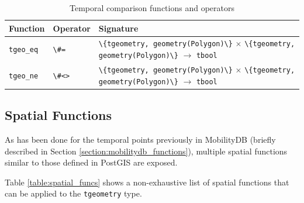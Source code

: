 \begin{table}[h!]
    \centering
    \begin{tabularx}{\textwidth}{|l|l|X|}
    \hline
    \textbf{Function}   & \textbf{Operator} & \textbf{Signature} \\
    \hline
    \lstinline+tgeo_eq+    & \lstinline+\#=+   & \lstinline+\{tgeometry, geometry(Polygon)\}+ $\times$ \lstinline+\{tgeometry, geometry(Polygon)\}+ $\rightarrow$ \lstinline+tbool+ \\
    \hline
    \lstinline+tgeo_ne+    & \lstinline+\#<>+  & \lstinline+\{tgeometry, geometry(Polygon)\}+ $\times$ \lstinline+\{tgeometry, geometry(Polygon)\}+ $\rightarrow$ \lstinline+tbool+ \\
    \hline
    \end{tabularx}
    \caption{Temporal comparison functions and operators}
    \label{table:temporal_comparison_funcs}
\end{table}

\subsection{Spatial Functions}
\label{section:spatial_funcs}

As has been done for the temporal points previously in MobilityDB (briefly described in Section \ref{section:mobilitydb_functions}), multiple spatial functions similar to those defined in PostGIS are exposed. 

Table \ref{table:spatial_funcs} shows a non-exhaustive list of spatial functions that can be applied to the \lstinline+tgeometry+ type.

